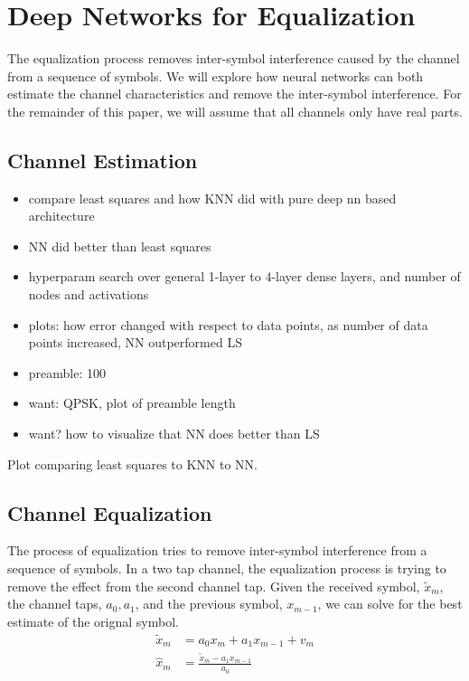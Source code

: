 \chapter{Deep Networks for Equalization}

The equalization process removes inter-symbol interference caused by the channel from a sequence of symbols.  We will explore how neural networks can both estimate the channel characteristics and remove the inter-symbol interference.  For the remainder of this paper, we will assume that all channels only have real parts. 

\section{Channel Estimation}

\begin{itemize}
\item compare least squares and how KNN did with pure deep nn based architecture
\item NN did better than least squares
\item hyperparam search over general 1-layer to 4-layer dense layers, and number of nodes and activations
\item plots: how error changed with respect to data points, as number of data points increased, NN outperformed LS
\item preamble: 100
\item want: QPSK, plot of preamble length
\item want? how to visualize that NN does better than LS
\end{itemize}

Plot comparing least squares to KNN to NN.



\section{Channel Equalization}

The process of equalization tries to remove inter-symbol interference from a sequence of symbols.  
In a two tap channel, the equalization process is trying to remove the effect from the second channel tap.  Given the received symbol, $\tilde{x}_m$, the channel taps, $a_0, a_1$, and the previous symbol, $x_{m-1}$, we can solve for the best estimate of the orignal symbol.
\begin{align}
\tilde{x}_m &= a_0 x_{m} + a_1 x_{m-1} + v_m\\
\hat{x}_m &= \frac{\tilde{x}_m - a_1 x_{m-1}}{a_0}
\end{align}


